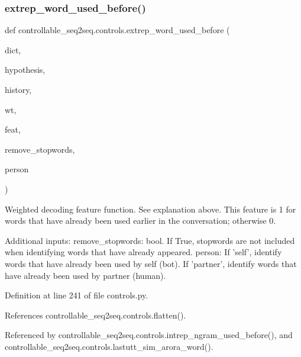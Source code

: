 \subsubsection{\texorpdfstring{extrep\+\_\+word\+\_\+used\+\_\+before()}{extrep\_word\_used\_before()}}
{\footnotesize\ttfamily def controllable\+\_\+seq2seq.\+controls.\+extrep\+\_\+word\+\_\+used\+\_\+before (\begin{DoxyParamCaption}\item[{}]{dict,  }\item[{}]{hypothesis,  }\item[{}]{history,  }\item[{}]{wt,  }\item[{}]{feat,  }\item[{}]{remove\+\_\+stopwords,  }\item[{}]{person }\end{DoxyParamCaption})}

\begin{DoxyVerb}Weighted decoding feature function. See explanation above.
This feature is 1 for words that have already been used earlier in the conversation;
otherwise 0.

Additional inputs:
  remove_stopwords: bool. If True, stopwords are not included when identifying words
    that have already appeared.
  person: If 'self', identify words that have already been used by self (bot).
    If 'partner', identify words that have already been used by partner (human).
\end{DoxyVerb}
 

Definition at line 241 of file controls.\+py.



References controllable\+\_\+seq2seq.\+controls.\+flatten().



Referenced by controllable\+\_\+seq2seq.\+controls.\+intrep\+\_\+ngram\+\_\+used\+\_\+before(), and controllable\+\_\+seq2seq.\+controls.\+lastutt\+\_\+sim\+\_\+arora\+\_\+word().

